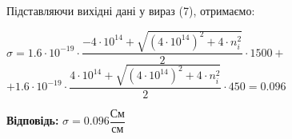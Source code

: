 \documentclass[a4paper,12pt]{article}
\begin{document}
Підставляючи вихідні дані у вираз (7), отримаємо:\\
\begin{center}
$\sigma = 1.6\cdot10^{-19}\cdot \dfrac {-4\cdot 10^{14} +\sqrt{(4\cdot 10^{14})^2 + 4\cdot n_i^2}}{2} \cdot 1500 + $ \\
\vspace{0.3cm}
$+ 1.6\cdot10^{-19}\cdot \dfrac {4\cdot 10^{14} +\sqrt{(4\cdot 10^{14})^2 + 4\cdot n_i^2}}{2} \cdot 450 =0.096$
\end{center}

\textbf{Відповідь:} 
$\sigma =  0.096\dfrac{ \text{См}} {\text{см}}$ 
\end{document}
